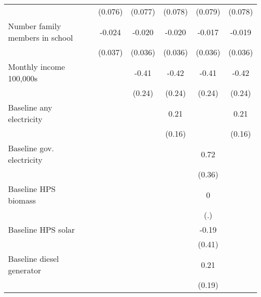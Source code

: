\begin{table}[htbp]
\begin{tabular*}{1\hsize}{@{\hskip\tabcolsep\extracolsep\fill}l*{6}{c}}
                &                  &  (0.076)         &  (0.077)         &  (0.078)         &  (0.079)         &  (0.078)         \\
Number family members in school&                  &   -0.024         &   -0.020         &   -0.020         &   -0.017         &   -0.019         \\
                &                  &  (0.037)         &  (0.036)         &  (0.036)         &  (0.036)         &  (0.036)         \\
Monthly income 100,000s&                  &                  &    -0.41\sym{*}  &    -0.42\sym{*}  &    -0.41\sym{*}  &    -0.42\sym{*}  \\
                &                  &                  &   (0.24)         &   (0.24)         &   (0.24)         &   (0.24)         \\
Baseline any electricity&                  &                  &                  &     0.21         &                  &     0.21         \\
                &                  &                  &                  &   (0.16)         &                  &   (0.16)         \\
Baseline gov. electricity&                  &                  &                  &                  &     0.72\sym{**} &                  \\
                &                  &                  &                  &                  &   (0.36)         &                  \\
Baseline HPS biomass&                  &                  &                  &                  &        0         &                  \\
                &                  &                  &                  &                  &      (.)         &                  \\
Baseline HPS solar&                  &                  &                  &                  &    -0.19         &                  \\
                &                  &                  &                  &                  &   (0.41)         &                  \\
Baseline diesel generator&                  &                  &                  &                  &     0.21         &                  \\
                &                  &                  &                  &                  &   (0.19)         &                  \\

\end{tabular*}
\end{table}
